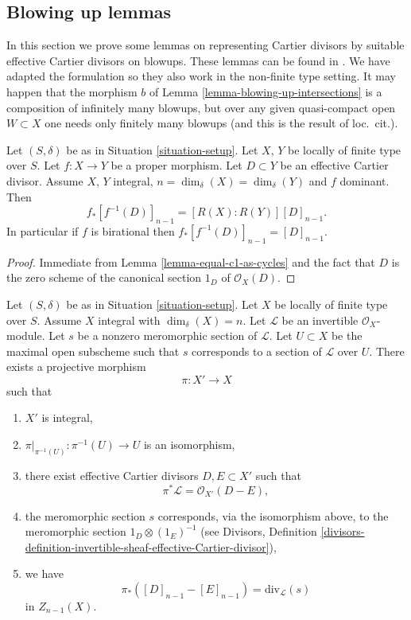 \subsection{Blowing up lemmas}
\label{subsection-blowing-up-lemmas}

\noindent
In this section we prove some lemmas on representing
Cartier divisors by suitable effective Cartier divisors
on blowups. These lemmas can be found in \cite[Section 2.4]{F}.
We have adapted the formulation so they also work
in the non-finite type setting. It may happen that the morphism $b$
of Lemma \ref{lemma-blowing-up-intersections} is a composition of
infinitely many blowups, but over any given quasi-compact open
$W \subset X$ one needs only finitely many blowups
(and this is the result of loc.\ cit.).

\begin{lemma}
\label{lemma-push-pull-effective-Cartier}
Let $(S, \delta)$ be as in Situation \ref{situation-setup}.
Let $X$, $Y$ be locally of finite type over $S$.
Let $f : X \to Y$ be a proper morphism.
Let $D \subset Y$ be an effective Cartier divisor.
Assume $X$, $Y$ integral, $n = \dim_\delta(X) = \dim_\delta(Y)$ and
$f$ dominant. Then
$$
f_*[f^{-1}(D)]_{n - 1} = [R(X) : R(Y)] [D]_{n - 1}.
$$
In particular if $f$ is birational then $f_*[f^{-1}(D)]_{n - 1} = [D]_{n - 1}$.
\end{lemma}

\begin{proof}
Immediate from Lemma \ref{lemma-equal-c1-as-cycles}
and the fact that $D$ is the zero
scheme of the canonical section $1_D$ of $\mathcal{O}_X(D)$.
\end{proof}

\begin{lemma}
\label{lemma-blowing-up-denominators}
Let $(S, \delta)$ be as in Situation \ref{situation-setup}.
Let $X$ be locally of finite type over $S$.
Assume $X$ integral with $\dim_\delta(X) = n$.
Let $\mathcal{L}$ be an invertible $\mathcal{O}_X$-module.
Let $s$ be a nonzero meromorphic section of $\mathcal{L}$.
Let $U \subset X$ be the maximal open subscheme such that
$s$ corresponds to a section of $\mathcal{L}$ over $U$.
There exists a projective morphism
$$
\pi : X' \longrightarrow X
$$
such that
\begin{enumerate}
\item $X'$ is integral,
\item $\pi|_{\pi^{-1}(U)} : \pi^{-1}(U) \to U$ is an isomorphism,
\item there exist effective Cartier divisors $D, E \subset X'$
such that
$$
\pi^*\mathcal{L} = \mathcal{O}_{X'}(D - E),
$$
\item the meromorphic section $s$ corresponds, via the isomorphism above,
to the meromorphic section $1_D \otimes (1_E)^{-1}$ (see
Divisors, Definition
\ref{divisors-definition-invertible-sheaf-effective-Cartier-divisor}),
\item we have
$$
\pi_*([D]_{n - 1} - [E]_{n - 1}) = \text{div}_\mathcal{L}(s)
$$
in $Z_{n - 1}(X)$.
\end{enumerate}
\end{lemma}

